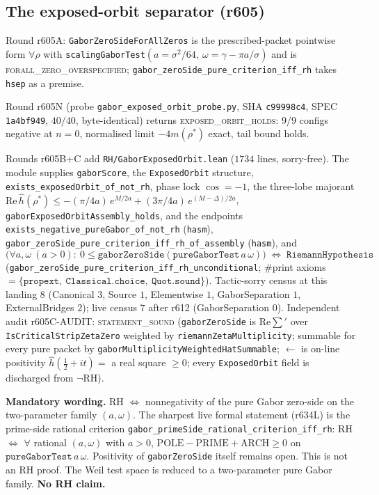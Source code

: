 \documentclass[11pt]{article}
\theoremstyle{definition}
\theoremstyle{remark}
\begin{document}
\subsection{The exposed-orbit separator (r605)}\label{sec:exposed-orbit}

Round r605A: \texttt{GaborZeroSideForAllZeros} is the prescribed-packet
pointwise form $\forall\rho$ with
\texttt{scalingGaborTest}$(a=\sigma^2/64,\ \omega=\gamma-\pi a/\sigma)$
and is \textsc{forall\_zero\_overspecified};
\texttt{gabor\_zeroSide\_pure\_criterion\_iff\_rh} takes \texttt{hsep}
as a premise.

Round r605N (probe \texttt{gabor\_exposed\_orbit\_probe.py},
SHA \texttt{c99998c4}, SPEC \texttt{1a4bf949}, $40/40$, byte-identical)
returns \textsc{exposed\_orbit\_holds}: $9/9$ configs negative at $n=0$,
normalised limit $-4m(\rho^*)$ exact, tail bound holds.

Rounds r605B+C add \texttt{RH/GaborExposedOrbit.lean} ($1734$ lines,
sorry-free).  The module supplies \texttt{gaborScore}, the
\texttt{ExposedOrbit} structure, \texttt{exists\_exposedOrbit\_of\_not\_rh},
phase lock $\cos=-1$, the three-lobe majorant
$\mathrm{Re}\,\hat h(\rho^*)\le -(\pi/4a)\,e^{M/2a}+(3\pi/4a)\,e^{(M-\Delta)/2a}$,
\texttt{gaborExposedOrbitAssembly\_holds}, and the endpoints
\texttt{exists\_negative\_pureGabor\_of\_not\_rh} (\texttt{hasm}),
\texttt{gabor\_zeroSide\_pure\_criterion\_iff\_rh\_of\_assembly}
(\texttt{hasm}), and
\[
\bigl(\forall a,\omega\ (a>0):\ 
0\le\texttt{gaborZeroSide}(\texttt{pureGaborTest}\,a\,\omega)\bigr)
\;\Longleftrightarrow\;
\texttt{RiemannHypothesis}
\]
(\texttt{gabor\_zeroSide\_pure\_criterion\_iff\_rh\_unconditional};
$\#$print axioms $=\{\texttt{propext},\ \texttt{Classical.choice},\ \texttt{Quot.sound}\}$).
Tactic-sorry census at this landing $8$ (Canonical $3$, Source $1$,
Elementwise $1$, GaborSeparation $1$, ExternalBridges $2$);
live census $7$ after r612 (GaborSeparation $0$).
Independent audit r605C-AUDIT: \textsc{statement\_sound}
(\texttt{gaborZeroSide} is $\mathrm{Re}\sum'$ over
\texttt{IsCriticalStripZetaZero} weighted by
\texttt{riemannZetaMultiplicity}; summable for every pure packet by
\texttt{gaborMultiplicityWeightedHatSummable}; $\leftarrow$ is on-line
positivity $\hat h(\tfrac12+it)=$ a real square $\ge 0$; every
\texttt{ExposedOrbit} field is discharged from $\neg$RH).

\textbf{Mandatory wording.}
RH $\Longleftrightarrow$ nonnegativity of the pure Gabor zero-side on
the two-parameter family $(a,\omega)$.  The sharpest live formal
statement (r634L) is the prime-side rational criterion
\texttt{gabor\_primeSide\_rational\_criterion\_iff\_rh}:
RH $\Longleftrightarrow$ $\forall$ rational $(a,\omega)$ with $a>0$,
$\mathrm{POLE}-\mathrm{PRIME}+\mathrm{ARCH}\ge 0$ on
$\texttt{pureGaborTest}\,a\,\omega$.
Positivity of \texttt{gaborZeroSide} itself remains open.
This is not an RH proof.  The Weil test space is reduced to a
two-parameter pure Gabor family.
\textbf{No RH claim.}
\end{document}
